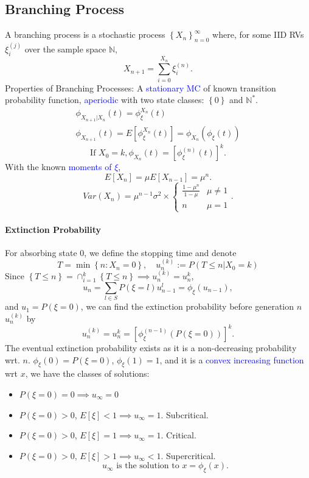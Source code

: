 \subsection{Branching Process}
A \textcolor{Bittersweet}{branching process} is a stochastic process ${\left\{
X_{n} \right\}}_{n=0}^{\infty}$ where, for some IID RVs $\xi_i^{(j)}$ over the
sample space $\mathbb{N}$,
\[X_{n+1}=\sum_{i=0}^{X_{n}} \xi_i^{(n)}.\]
\textcolor{Bittersweet}{Properties} of Branching Processes: A
\textcolor{Blue}{stationary MC} of known transition probability function,
\textcolor{Blue}{aperiodic} with two state classes: $\left\{ 0 \right\}$ and $
\mathbb{N}^{*}$.
\begin{gather*}
\phi_{X_{n+1}|X_{n}}\left( t \right)=\phi_{\xi}^{X_{n}}\left( t \right)\\
\phi_{X_{n+1}}\left( t \right) =E\left[ \phi_\xi^{X_{n}}\left( t \right)
\right]=\phi_{X_{n}}\left( \phi_\xi\left( t \right) \right)
\end{gather*}
\[\text{If }X_0=k, \phi_{X_{n}}\left( t \right) ={\left[ \phi_\xi^{(n)}\left( t
\right) \right]}^{k}.\]
With the known \textcolor{Blue}{moments of $\xi$},
\[E\left[ X_{n}\right] =\mu E\left[ X_{n-1} \right]=\mu^{n}.\] 
\[Var\left( X_{n} \right)=\mu^{n-1}\sigma^{2}\times
\begin{cases}\frac{1-\mu^{n}}{1-\mu}&\mu\neq 1\\n&\mu=1\end{cases}.\]
\paragraph{Extinction Probability}
For absorbing state $0$, we define the stopping time and denote
\[T=\min{\left\{ n: X_{n}=0 \right\} },\quad u_{n}^{\left( k \right) }:=P\left(
T\le n|X_0=k \right) \]
Since $\left\{ T\le n \right\} =\cap ^{k}_{i=1}\left\{ T\le n \right\} \implies
u_{n}^{(k)}=u_{n}^{k}$,
\[u_{n}=\sum_{l\in S} P\left( \xi=l \right) u_{n-1}^{l}=\phi_\xi\left( u_{n-1}
\right),\]
and $u_1=P\left( \xi=0 \right) $, we can find the
\textcolor{Bittersweet}{extinction probability before generation $n$}
$u_{n}^{\left( k \right) }$ by
\[u_{n}^{(k)}=u_{n}^{k}={\left[ \phi_\xi^{(n-1)}\left( P\left( \xi=0 \right) \right) \right]}^{k}.\]
The eventual \textcolor{Bittersweet}{extinction probability} exists as it is a
non-decreasing probability wrt. $n$. 
$\phi_\xi\left( 0 \right) =P\left( \xi=0 \right) $, $\phi_\xi\left( 1 \right)
=1$, and it is a \textcolor{Blue}{convex increasing function} wrt $x$, we have
the classes of solutions:
\begin{itemize}
  \item $P\left( \xi=0 \right) =0\implies u_{\infty}=0$
  \item $P\left( \xi=0 \right) >0$, $E\left[ \xi \right] <
    1\implies u_{\infty}=1$. \textcolor{Bittersweet}{Subcritical}.
  \item $P\left( \xi=0 \right) >0$, $E\left[ \xi \right] =
    1\implies u_{\infty}=1$. \textcolor{Bittersweet}{Critical}.
  \item $P\left( \xi=0 \right) >0$, $E\left[ \xi \right] >
    1\implies u_{\infty}<1$. \textcolor{Bittersweet}{Supercritical}.
    \[u_{\infty}\text{ is the solution to }x=\phi_\xi\left( x \right).\]
\end{itemize}

